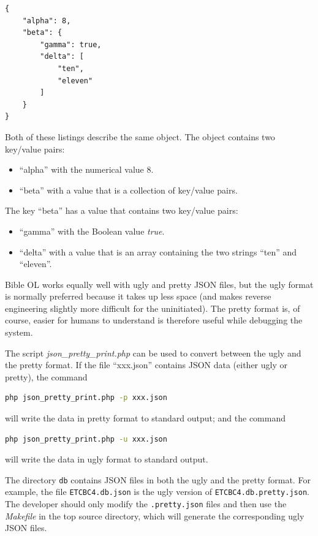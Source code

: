 \documentclass[11pt,oneside,a4paper]{memoir}
\begin{document}
\begin{lstlisting}
{
    "alpha": 8,
    "beta": {
        "gamma": true,
        "delta": [
            "ten",
            "eleven"
        ]
    }
}
\end{lstlisting}

Both of these listings describe the same object. The object contains two key/value pairs:

\begin{itemize}
\item ``alpha'' with the numerical value 8.
\item ``beta'' with a value that is a collection of key/value pairs.
\end{itemize}

The key ``beta'' has a value that contains two key/value pairs:

\begin{itemize}
\item ``gamma'' with the Boolean value \emph{true}.
\item ``delta'' with a value that is an array containing the two strings ``ten'' and ``eleven''.
\end{itemize}


Bible OL works equally well with ugly and pretty JSON files, but the ugly format is normally
preferred because it takes up less space (and makes reverse engineering slightly more difficult for
the uninitiated). The pretty format is, of course, easier for humans to understand is therefore useful
while debugging the system.

The script \emph{json\_pretty\_print.php} can be used to convert
between the ugly and the pretty format. If the file
``xxx.json'' contains JSON data (either ugly or pretty), the command

\begin{lstlisting}[language=bash]
php json_pretty_print.php -p xxx.json
\end{lstlisting}

\noindent
will write the data in pretty format to standard output; and the command

\begin{lstlisting}[language=bash]
php json_pretty_print.php -u xxx.json
\end{lstlisting}

\noindent
will write the data in ugly format to standard output.

The directory \texttt{db} contains JSON files in both the ugly and the pretty format. For example,
the file \texttt{ETCBC4.db.json} is the ugly version of \texttt{ETCBC4.db.pretty.json}. The
developer should only modify the \texttt{.pretty.json} files and then use the
\emph{Makefile} in the top source directory, which will generate the corresponding ugly JSON files.
\end{document}
